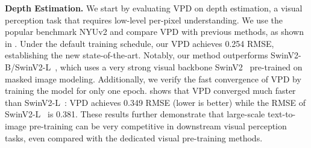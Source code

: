 \documentclass[10pt,twocolumn,letterpaper]{article}
\newcommand{\paragrapha}[2][4pt]{\vspace{#1}\noindent\textbf{#2}}
\begin{document}
\paragrapha{Depth Estimation.} We start by evaluating VPD on depth estimation, a visual perception task that requires low-level per-pixel understanding. We use the popular benchmark NYUv2 and compare VPD with previous methods, as shown in . Under the default training schedule, our VPD achieves 0.254 RMSE, establishing the new state-of-the-art. Notably, our method outperforms SwinV2-B/SwinV2-L~\cite{xie2022revealing}, which uses a very strong visual backbone SwinV2~\cite{liu2022swinv2} pre-trained on masked image modeling. Additionally, we verify the fast convergence of VPD by training the model for only one epoch.  shows that VPD converged much faster than SwinV2-L~\cite{xie2022revealing}: VPD achieves 0.349 RMSE (lower is better) while the RMSE of SwinV2-L~\cite{xie2022revealing} is 0.381. These results further demonstrate that large-scale text-to-image pre-training can be very competitive in downstream visual perception tasks, even compared with the dedicated visual pre-training methods.
\end{document}

